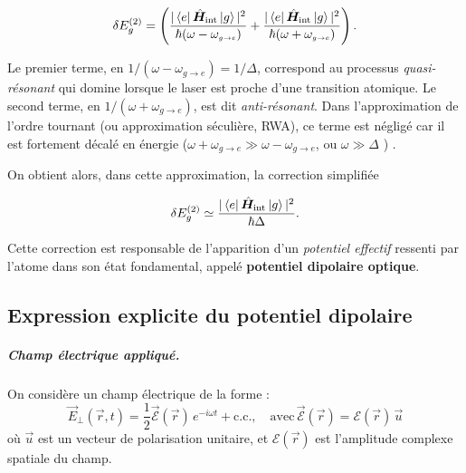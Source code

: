 \begin{itemize}[label = $\bullet$]
\begin{equation}
\delta E_g^{(2)} =  
 \left( 
\frac{|\bra{e} \hat{\bm{H}}_{\text{int}} \ket{g}|^2}{\hbar(\omega - \omega_{\scriptscriptstyle g\rightarrow e})}
+ \frac{|\bra{e} \hat{\bm{H}}_{\text{int}} \ket{g}|^2}{\hbar(\omega + \omega_{\scriptscriptstyle g\rightarrow e})}
\right).
\end{equation}

Le premier terme, en \(1/(\omega - \omega_{\scriptscriptstyle g\rightarrow e}) = 1/\Delta\), correspond au processus \emph{quasi-résonant} qui domine lorsque le laser est proche d’une transition atomique. 
Le second terme, en \(1/(\omega + \omega_{\scriptscriptstyle g\rightarrow e})\), est dit \emph{anti-résonant}. 
Dans l’approximation de l’ordre tournant (ou approximation séculière, RWA), ce terme est négligé car il est fortement décalé en énergie (\(\omega + \omega_{\scriptscriptstyle g\rightarrow e} \gg \omega - \omega_{\scriptscriptstyle g\rightarrow e}\), ou \(\omega \gg \Delta \) ) .

On obtient alors, dans cette approximation, la correction simplifiée

\begin{equation}
\delta E_g^{(2)} \simeq \frac{|\bra{e} \hat{\bm{H}}_{\text{int}} \ket{g}|^2}{\hbar \Delta}. \label{chap7:eq.E_g(2).1}
\end{equation}

\end{itemize}

Cette correction est responsable de l’apparition d’un \emph{potentiel effectif} ressenti par l’atome dans son état fondamental, appelé \textbf{potentiel dipolaire optique}.



\subsection{Expression explicite du potentiel dipolaire}

\subparagraph{Champ électrique appliqué.}
On considère un champ électrique de la forme :
\begin{equation}\label{chap7:eq.elec.clas.1}
\vec{E}_\perp(\vec{r},t) = \frac{1}{2} \vec{\mathcal{E}}(\vec{r}) \, e^{-i\omega t} + \text{c.c.}, \quad \mbox{avec}  \, \vec{\mathcal{E}}(\vec{r}) =  {\mathcal{E}}(\vec{r})\, \vec{u}
\end{equation}
où \( \vec{u} \) est un vecteur de polarisation unitaire, et \( {\mathcal{E}}(\vec{r}) \) est l’amplitude complexe spatiale du champ.


